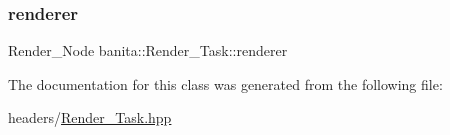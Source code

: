 \subsubsection{\texorpdfstring{renderer}{renderer}}
{\footnotesize\ttfamily Render\+\_\+\+Node banita\+::\+Render\+\_\+\+Task\+::renderer}



The documentation for this class was generated from the following file\+:\begin{DoxyCompactItemize}
\item 
headers/\mbox{\hyperlink{_render___task_8hpp}{Render\+\_\+\+Task.\+hpp}}\end{DoxyCompactItemize}
